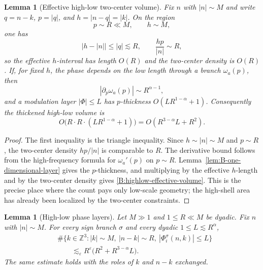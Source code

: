 \documentclass[10pt]{amsart}
\numberwithin{equation}{section}
\theoremstyle{plain}
\newtheorem{lemma}[theorem]{Lemma}
\theoremstyle{definition}
\theoremstyle{remark}
\newcommand{\Z}{\mathbb{Z}}
\newcommand{\eps}{\varepsilon}
\begin{document}
\begin{lemma}[Effective high-low two-center volume]\label{lem:B-highlow-geometry}
Fix $n$ with $|n|\sim M$ and write $q=n-k$, $p=|q|$, and $h=|n-q|=|k|$.  On the region
\[
        p\sim R\ll M,\qquad h\sim M,
\]
one has
\[
        |h-|n||\le |q|\lesssim R,
        \qquad
        \frac{hp}{|n|}\sim R,
\]
so the effective $h$-interval has length $O(R)$ and the two-center density is $O(R)$.  If, for fixed $h$, the phase depends on the low length through a branch $\omega_a(p)$, then
\[
        |\partial_p\omega_a(p)|\sim R^{\alpha-1},
\]
and a modulation layer $|\Phi|\le L$ has $p$-thickness $O(LR^{1-\alpha}+1)$.  Consequently the thickened high-low volume is
\begin{equation}\label{B:highlow-effective-volume}
        O\bigl(R\cdot R\cdot(LR^{1-\alpha}+1)\bigr)
        =O(R^{3-\alpha}L+R^2).
\end{equation}
\end{lemma}

\begin{proof}
The first inequality is the triangle inequality.  Since $h\sim |n|\sim M$ and $p\sim R$, the two-center density $hp/|n|$ is comparable to $R$.  The derivative bound follows from the high-frequency formula for $\omega_a'(p)$ on $p\sim R$.  Lemma~\ref{lem:B-one-dimensional-layer} gives the $p$-thickness, and multiplying by the effective $h$-length and by the two-center density gives \eqref{B:highlow-effective-volume}.  This is the precise place where the count pays only low-scale geometry; the high-shell area has already been localized by the two-center constraints.
\end{proof}

\begin{lemma}[High-low phase layers]\label{lem:B-highlow-layer}
Let \(M\gg1\) and \(1\le R\ll M\) be dyadic.  Fix \(n\) with \(|n|\sim M\).  For every sign branch \(\sigma\) and every dyadic \(1\le L\lesssim R^\alpha\),
\begin{equation}\label{B:highlow-layer}
\begin{aligned}
&\#\{k\in\Z^3: |k|\sim M,
      \ |n-k|\sim R,
      \ |\Phi_i^\sigma(n,k)|\le L\} \\
&\qquad\lesssim_\eps R^\eps\bigl(R^2+R^{3-\alpha}L\bigr).
\end{aligned}
\end{equation}
The same estimate holds with the roles of \(k\) and \(n-k\) exchanged.
\end{lemma}
\end{document}
